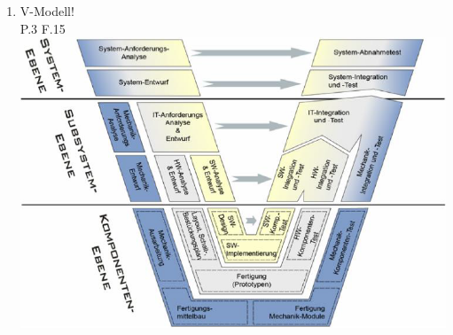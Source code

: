 \documentclass[10pt,a4paper,fleqn]{article}
\begin{document}
\begin{enumerate}
\begin{tabular}{|l|l|}
			\hline 
			\end{tabular} 
	\item V-Modell!\\
		P.3 F.15\\
		\includegraphics[scale=0.5]{v.png}

\end{enumerate}
\end{document}
